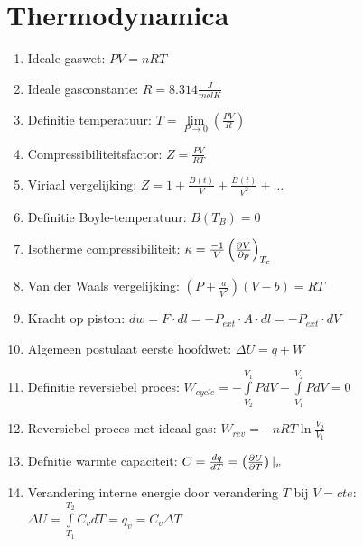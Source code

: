 \documentclass[12pt]{article}
\begin{document}
    \maketitle

	\section{Thermodynamica}%
	\label{sec:Thermodynamica}
	\begin{enumerate}
		\item Ideale gaswet: $ PV = nRT $
		\item Ideale gasconstante:  $ R = 8.314 \frac{J}{mol K} $
		\item Definitie temperatuur: $ T = \lim\limits_{P \to 0} \left(\frac{PV}{R}\right) $
		\item Compressibiliteitsfactor: $ Z = \frac{PV}{RT} $
		\item Viriaal vergelijking:  $ Z = 1 + \frac{B(t)}{V} + \frac{B(t)}{V^2} + \dots $
		\item Definitie Boyle-temperatuur: $ B(T_B) = 0 $
		\item Isotherme compressibiliteit:  $ \kappa = \frac{-1}{V}\left( \pdv{V}{p} \right)_{T_c} $
		\item Van der Waals vergelijking: $ (P + \frac{a}{V^2})(V-b) = RT $
		\item Kracht op piston:  $ dw = F\cdot dl = -P_{ext}\cdot A\cdot dl = -P_{ext}\cdot dV$
		\item Algemeen postulaat eerste hoofdwet: $ \Delta U = q + W $
		\item Definitie reversiebel proces:  $ W_{cycle} = -\int\limits_{V_2}^{V_1} P dV - \int\limits_{V_1}^{V_2} P dV = 0 $
		\item Reversiebel proces met ideaal gas: $ W_{rev} = -nRT \ln \frac{V_2}{V_1} $
		\item Defnitie warmte capaciteit: $ C = \frac{dq}{dT} = \left(\pdv{U}{T}\right) |_v $
		\item Verandering interne energie door verandering  $T$ bij  $V=cte$: $ \Delta U = \int\limits_{T_1}^{T_2} C_v dT = q_v = C_v \Delta T $
	\end{enumerate}
\end{document}
